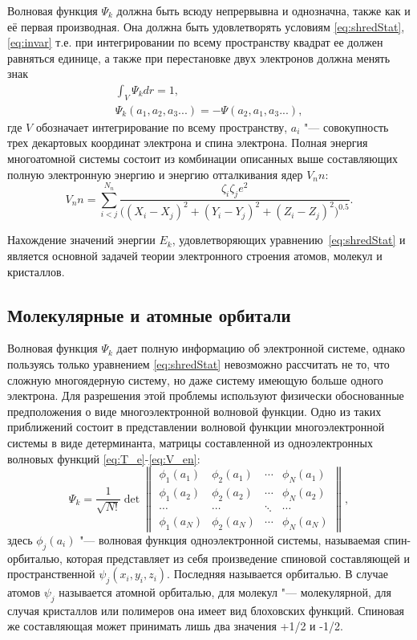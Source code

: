 Волновая функция $\Psi_k$ должна быть всюду непрервывна и однозначна, также как и её первая производная. Она должна быть удовлетворять условиям \ref{eq:shredStat}, \ref{eq:invar} т.е. при интегрировании по всему пространству квадрат ее должен равняться единице, а также при перестановке двух электронов должна менять знак
\begin{eqnarray}
\label{eq:norm}
\int_{V}\Psi_kdr=1, \\
\label{eq:invar}
\Psi_k(a_1,a_2,a_3...)=-\Psi(a_2,a_1,a_3...),
\end{eqnarray}
где $V$ обозначает интегрирование по всему пространству, $a_i$ "--- совокупность трех декартовых координат электрона и спина электрона. 
Полная энергия многоатомной системы состоит из комбинации описанных выше составляющих полную электронную энергию и энергию отталкивания ядер $V_nn$:
\begin{equation}
V_nn=\sum_{i<j}^{N_n}\frac{\zeta_i\zeta_j e^{2}}{\biggl((X_i-X_j)^2+(Y_i-Y_j)^2+(Z_i-Z_j)^2\biggr)^{0.5}}.
\end{equation}

Нахождение значений энергии $E_k$, удовлетворяющих уравнению~\ref{eq:shredStat} и является основной задачей теории электронного строения атомов, молекул и кристаллов.

\subsection{Молекулярные и атомные орбитали}

Волновая функция $\Psi_k$ дает полную информацию об электронной системе, однако пользуясь только уравнением \ref{eq:shredStat} невозможно рассчитать не то, что сложную многоядерную систему, но даже систему имеющую больше одного электрона. 
Для разрешения этой проблемы используют физически обоснованные предположения о виде многоэлектронной волновой функции. 
Одно из таких приближений состоит в представлении волновой функции многоэлектронной системы в виде детерминанта, матрицы составленной из одноэлектронных волновых функций \ref{eq:T_e}-\ref{eq:V_en}:
\begin{equation}
\label{eq:LCAO}
\Psi_k=\frac{1}{\sqrt{N!}}\det 
\begin{Vmatrix}
\phi_1(a_1) & \phi_2(a_1) & \cdots & \phi_N(a_1) \\
\phi_1(a_2) & \phi_2(a_2) & \cdots & \phi_N(a_2) \\
\cdots & \cdots & \ddots & \cdots \\
\phi_1(a_N) & \phi_2(a_N) & \cdots & \phi_N(a_N) 
\end{Vmatrix},
\end{equation}
здесь $\phi_j(a_i)$ "--- волновая функция одноэлектронной системы, называемая спин-орбиталью, которая представляет из себя произведение спиновой составляющей и пространственной $\psi_j(x_i,y_i,z_i)$. 
Последняя называется орбиталью. 
В случае атомов $\psi_j$ называется атомной орбиталью, для молекул "--- молекулярной, для случая кристаллов или полимеров она имеет вид блоховских функций. 
Спиновая же составляющая может принимать лишь два значения +1/2 и -1/2.

